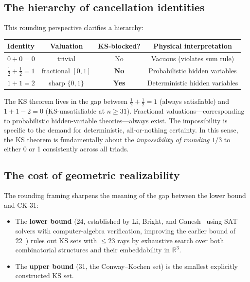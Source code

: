 \documentclass[12pt,a4paper]{article}
\newcommand{\R}{\mathbb{R}}
\newcommand{\CK}{\mathrm{CK}\text{-}31}
\begin{document}
\subsection{The hierarchy of cancellation identities}\label{sec:hierarchy}

This rounding perspective clarifies a hierarchy:

\begin{center}
\begin{tabular}{lccc}
\toprule
Identity & Valuation & KS-blocked? & Physical interpretation \\
\midrule
$0 + 0 = 0$ & trivial & No & Vacuous (violates sum rule) \\
$\frac{1}{2} + \frac{1}{2} = 1$ & fractional $[0,1]$ & \textbf{No} & Probabilistic hidden variables \\
$1 + 1 = 2$ & sharp $\{0,1\}$ & \textbf{Yes} & Deterministic hidden variables \\
\bottomrule
\end{tabular}
\end{center}

The KS theorem lives in the gap between $\frac{1}{2} + \frac{1}{2} = 1$ (always satisfiable) and $1 + 1 - 2 = 0$ (KS-unsatisfiable at $n \geq 31$). Fractional valuations---corresponding to probabilistic hidden-variable theories---always exist. The impossibility is specific to the demand for deterministic, all-or-nothing certainty. In this sense, the KS theorem is fundamentally about the \emph{impossibility of rounding} $1/3$ to either 0 or 1 consistently across all triads.

\subsection{The cost of geometric realizability}\label{sec:cost}

The rounding framing sharpens the meaning of the gap between the lower bound and $\CK$:

\begin{itemize}
    \item The \textbf{lower bound} (24, established by Li, Bright, and Ganesh~\cite{LiBrightGanesh2024} using SAT solvers with computer-algebra verification, improving the earlier bound of 22~\cite{UijlenWesterbaan2016}) rules out KS sets with $\leq 23$ rays by exhaustive search over both combinatorial structures and their embeddability in $\R^3$.
    \item The \textbf{upper bound} (31, the Conway--Kochen set) is the smallest explicitly constructed KS set.
\end{itemize}
\end{document}
